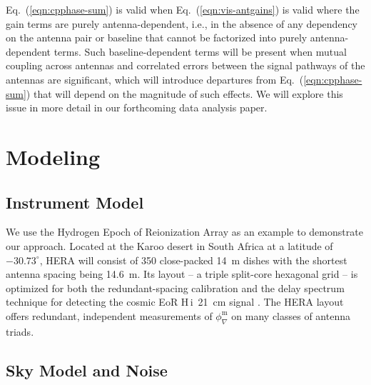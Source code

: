 \documentclass[
reprint,
superscriptaddress,
amsmath,
amssymb,
aps,
prd
]{revtex4-1}
\newcommand{\HI}{H\,{\sc i}}
\begin{document}

Eq.~(\ref{eqn:cpphase-sum}) is valid when Eq.~(\ref{eqn:vis-antgains}) is valid where the gain terms are purely antenna-dependent, i.e., in the absence of any dependency on the antenna pair or baseline that cannot be factorized into purely antenna-dependent terms. Such baseline-dependent terms will be present when mutual coupling across antennas and correlated errors between the signal pathways of the antennas are significant, which will introduce departures from Eq.~(\ref{eqn:cpphase-sum}) that will depend on the magnitude of such effects. We will explore this issue in more detail in our forthcoming data analysis paper. 

\section{Modeling}\label{sec:modeling}

\subsection{Instrument Model}\label{sec:instrument}

We use the Hydrogen Epoch of Reionization Array \cite[HERA;][]{deb17,thy16,ewa16,neb16,patra17} as an example to demonstrate our approach. Located at the Karoo desert in South Africa at a latitude of $-30.73^\circ$, HERA will consist of 350 close-packed 14~m dishes with the shortest antenna spacing being 14.6~m. Its layout -- a triple split-core hexagonal grid -- is optimized for both the redundant-spacing calibration and the delay spectrum technique for detecting the cosmic EoR \HI\ 21~cm signal \cite{dil16}. The HERA layout offers redundant, independent measurements of $\phi_\nabla^\textrm{m}$ on many classes of antenna triads. 

\subsection{Sky Model and Noise}\label{sec:skymodel-noise}
\end{document}
